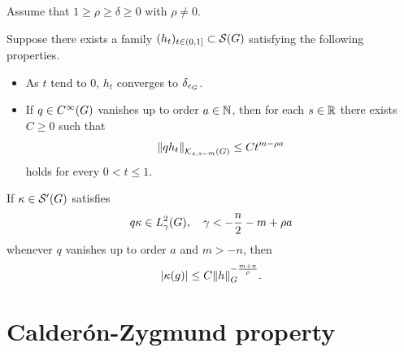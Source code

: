 \begin{theorem}
    Assume that $1 \geq \rho \geq \delta \geq 0$ with $\rho \neq 0$.

    Suppose there exists a family $(h_t)_{t \in (0, 1]} \subset \Schwartz \Group$
    satisfying the following properties.
    \begin{itemize}
        \item As $t$ tend to $0$, $h_t$ converges to $\delta_{e_\Group}$.
        \item If $q \in \SmoothFunctions {\Group}$ vanishes up to order $a \in \N$,
            then for each $s \in \R$ there exists $C \geq 0$ such that
            \begin{align*}
                \norm [\KernelsSobolev s {s - m}] {q h_t}
                \leq C t^{m - \rho a}
            \end{align*}
            holds for every $0 < t \leq 1$.
    \end{itemize}

    If $\kappa \in \TemperedDistributions \Group$ satisfies
    \begin{align*}
        q \kappa \in \Sobolev \gamma,
        \quad \gamma < -\frac n 2 -m + \rho a
    \end{align*}
    whenever $q$ vanishes up to order $a$ and $m > -n$,
    then
    \begin{align*}
        \abs{\kappa(g)} \leq C \norm [\Group] h^{-\frac{m + n} \rho}.
    \end{align*}
\end{theorem}

\section{Calder\'on-Zygmund property}
